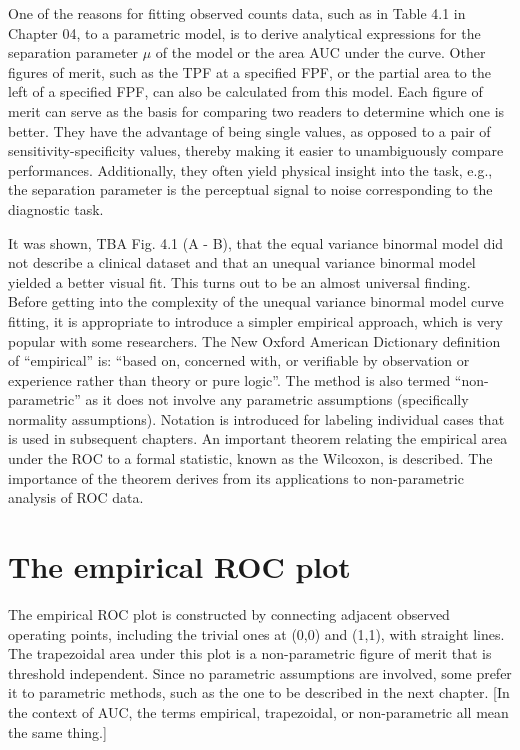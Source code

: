 \documentclass[
]{book}
\begin{document}
One of the reasons for fitting observed counts data, such as in Table 4.1 in Chapter 04, to a parametric model, is to derive analytical expressions for the separation parameter \(\mu\) of the model or the area AUC under the curve. Other figures of merit, such as the TPF at a specified FPF, or the partial area to the left of a specified FPF, can also be calculated from this model. Each figure of merit can serve as the basis for comparing two readers to determine which one is better. They have the advantage of being single values, as opposed to a pair of sensitivity-specificity values, thereby making it easier to unambiguously compare performances. Additionally, they often yield physical insight into the task, e.g., the separation parameter is the perceptual signal to noise corresponding to the diagnostic task.

It was shown, TBA Fig. 4.1 (A - B), that the equal variance binormal model did not describe a clinical dataset and that an unequal variance binormal model yielded a better visual fit. This turns out to be an almost universal finding. Before getting into the complexity of the unequal variance binormal model curve fitting, it is appropriate to introduce a simpler empirical approach, which is very popular with some researchers. The New Oxford American Dictionary definition of ``empirical'' is: ``based on, concerned with, or verifiable by observation or experience rather than theory or pure logic''. The method is also termed ``non-parametric'' as it does not involve any parametric assumptions (specifically normality assumptions). Notation is introduced for labeling individual cases that is used in subsequent chapters. An important theorem relating the empirical area under the ROC to a formal statistic, known as the Wilcoxon, is described. The importance of the theorem derives from its applications to non-parametric analysis of ROC data.

\hypertarget{empirical-ROC-plot}{%
\section{The empirical ROC plot}\label{empirical-ROC-plot}}

The empirical ROC plot is constructed by connecting adjacent observed operating points, including the trivial ones at (0,0) and (1,1), with straight lines. The trapezoidal area under this plot is a non-parametric figure of merit that is threshold independent. Since no parametric assumptions are involved, some prefer it to parametric methods, such as the one to be described in the next chapter. {[}In the context of AUC, the terms empirical, trapezoidal, or non-parametric all mean the same thing.{]}
\end{document}
